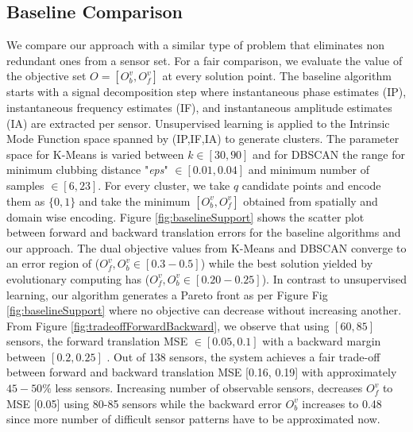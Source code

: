  
\subsection{ Baseline Comparison }

We compare our approach with a similar type of problem that eliminates non redundant ones from a sensor set.
For a fair comparison, we evaluate the value of the objective set $O = [O^v_b, O^v_f]$ at every solution point.
The baseline algorithm starts with a signal decomposition step where instantaneous phase estimates (IP), instantaneous frequency estimates (IF), and instantaneous amplitude estimates (IA) are extracted per sensor.
Unsupervised learning is applied to the Intrinsic Mode Function space spanned by (IP,IF,IA) to generate clusters.
The parameter space for K-Means \cite{likas2003global} is varied between $k \in [30, 90]$ and for DBSCAN \cite{schubert2017dbscan} the range for minimum clubbing distance "\textit{eps}" $\in [ 0.01,0.04 ] $ and minimum number of samples $\in [6,23]$. 
For every cluster, we take $q$ candidate points and encode them as $\{0,1\}$ and take the minimum $[O^v_b, O^v_f]$ obtained from spatially and domain wise encoding.
Figure \ref{fig:baselineSupport} shows the scatter plot between forward and backward translation errors for the baseline algorithms and our approach.
The dual objective values from  K-Means and DBSCAN converge to an error region of ($O^v_f, O^v_b \in [0.3-0.5]$) while the best solution yielded by evolutionary computing has ($O^v_f, O^v_b \in [0.20-0.25]$). 
In contrast to unsupervised learning, our algorithm generates a Pareto front as per Figure Fig \ref{fig:baselineSupport} where no objective can decrease without increasing another.
From Figure \ref{fig:tradeoffForwardBackward}, we observe that using $[60,85]$ sensors, the forward translation MSE $ \in [0.05, 0.1]$ with a backward margin between $[0.2,0.25]$ .
Out of 138 sensors, the system achieves a fair trade-off between forward and backward translation MSE [0.16, 0.19] with approximately $45-50 \%$ less sensors. 
Increasing number of observable sensors, decreases $O^v_f$ to MSE [0.05] using 80-85 sensors while the backward error $O^v_b$ increases to 0.48 since more number of difficult sensor patterns have to be approximated now.




